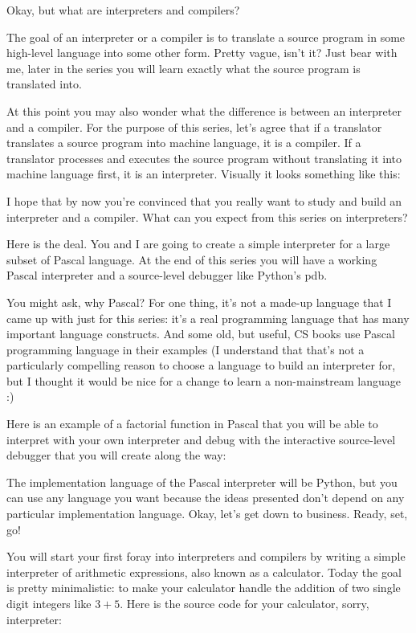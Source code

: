 Okay, but what are interpreters and compilers?

The goal of an interpreter or a compiler is to translate a source program in
some high-level language into some other form. Pretty vague, isn’t it? Just bear
with me, later in the series you will learn exactly what the source program is
translated into.

At this point you may also wonder what the difference is between an interpreter
and a compiler. For the purpose of this series, let’s agree that if a translator
translates a source program into machine language, it is a compiler. If a
translator processes and executes the source program without translating it into
machine language first, it is an interpreter. Visually it looks something like
this:
\begin{framed}\end{framed}

I hope that by now you’re convinced that you really want to study and build an
interpreter and a compiler. What can you expect from this series on
interpreters?

Here is the deal. You and I are going to create a simple interpreter for a large
subset of Pascal language. At the end of this series you will have a working
Pascal interpreter and a source-level debugger like Python’s pdb.

You might ask, why Pascal? For one thing, it’s not a made-up language that I
came up with just for this series: it’s a real programming language that has
many important language constructs. And some old, but useful, CS books use
Pascal programming language in their examples (I understand that that’s not a
particularly compelling reason to choose a language to build an interpreter for,
but I thought it would be nice for a change to learn a non-mainstream language
:)

Here is an example of a factorial function in Pascal that you will be able to
interpret with your own interpreter and debug with the interactive source-level
debugger that you will create along the way:

The implementation language of the Pascal interpreter will be Python, but you
can use any language you want because the ideas presented don’t depend on any
particular implementation language. Okay, let’s get down to business. Ready,
set, go!

You will start your first foray into interpreters and compilers by writing a
simple interpreter of arithmetic expressions, also known as a calculator. Today
the goal is pretty minimalistic: to make your calculator handle the addition of
two single digit integers like $3+5$. Here is the source code for your
calculator, sorry, interpreter:

